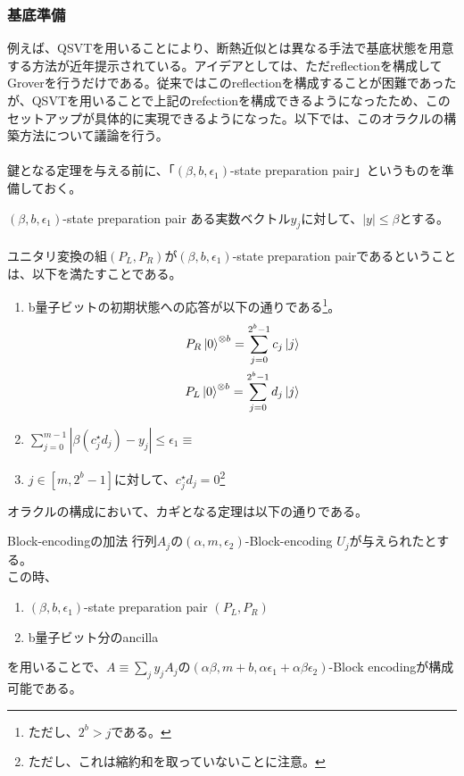 \documentclass[a4paper,10.5pt]{article}
\numberwithin{equation}{section}
\begin{document}
\subsubsection{基底準備}
例えば、QSVTを用いることにより、断熱近似とは異なる手法で基底状態を用意する方法が近年提示されている\cite{Lin:2020zni}。アイデアとしては、ただreflectionを構成してGroverを行うだけである。従来ではこのreflectionを構成することが困難であったが、QSVTを用いることで上記のrefectionを構成できるようになったため、このセットアップが具体的に実現できるようになった。以下では、このオラクルの構築方法について議論を行う。\\
\\
鍵となる定理を与える前に、「$(\beta,b,\epsilon_{1})$-state preparation pair」というものを準備しておく。
\begin{defbox}{$(\beta,b,\epsilon_{1})$-state preparation pair}
    ある実数ベクトル$y_{j}$に対して、$|y|\leq \beta$とする。\\
    \\
    ユニタリ変換の組$(P_{L},P_{R})$が$(\beta,b,\epsilon_{1})$-state preparation pairであるということは、以下を満たすことである。
    \begin{enumerate}
        \item b量子ビットの初期状態への応答が以下の通りである\footnote{ただし、$2^{b}>j$である。}。
        \begin{align*}
            P_{R}\ket{0}^{\otimes b}=\sum_{j=0}^{2^{b}-1}c_{j}\ket{j}\\
            P_{L}\ket{0}^{\otimes b}=\sum_{j=0}^{2^{b}-1}d_{j}\ket{j}
        \end{align*}
        \item $\sum_{j=0}^{m-1}|\beta(c_{j}^{\star}d_{j})-y_{j}|\leq \epsilon_{1}\equiv$
        \item $j\in [m,2^{b}-1]$に対して、$c_{j}^{\star}d_{j}=0$\footnote{ただし、これは縮約和を取っていないことに注意。}
    \end{enumerate}
\end{defbox}
オラクルの構成において、カギとなる定理は以下の通りである。
\begin{theorembox}{Block-encodingの加法}
    行列$A_{j}$の$(\alpha,m,\epsilon_{2})$-Block-encoding $U_{j}$が与えられたとする。\\
    この時、
    \begin{enumerate}
        \item $(\beta,b,\epsilon_{1})$-state preparation pair $(P_{L},P_{R})$
        \item b量子ビット分のancilla
    \end{enumerate}
    を用いることで、$A\equiv \sum_{j}y_{j}A_{j}$の$(\alpha\beta,m+b,\alpha\epsilon_{1}+\alpha\beta\epsilon_{2})$-Block encodingが構成可能である。
\end{theorembox}
\end{document}
